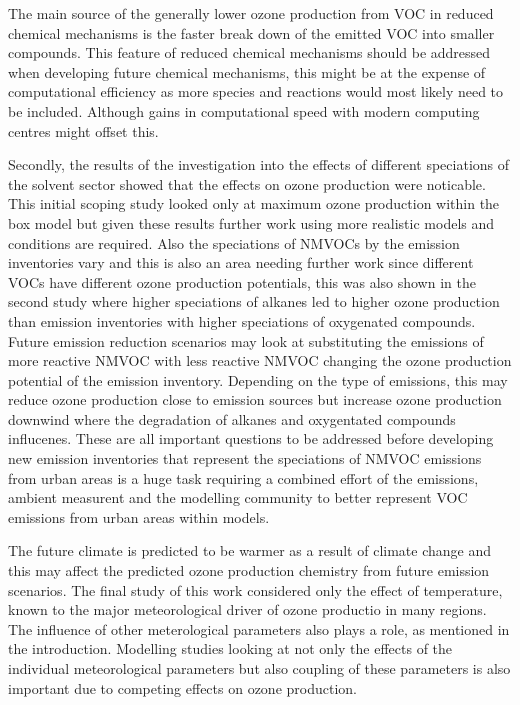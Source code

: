 The main source of the generally lower ozone production from VOC in reduced chemical mechanisms is the faster break down of the emitted VOC into smaller compounds.
This feature of reduced chemical mechanisms should be addressed when developing future chemical mechanisms, this might be at the expense of computational efficiency as more species and reactions would most likely need to be included.
Although gains in computational speed with modern computing centres might offset this.

Secondly, the results of the investigation into the effects of different speciations of the solvent sector showed that the effects on ozone production were noticable.
This initial scoping study looked only at maximum ozone production within the box model but given these results further work using more realistic models and conditions are required.
Also the speciations of NMVOCs by the emission inventories vary and this is also an area needing further work since different VOCs have different ozone production potentials, this was also shown in the second study where higher speciations of alkanes led to higher ozone production than emission inventories with higher speciations of oxygenated compounds.
Future emission reduction scenarios may look at substituting the emissions of more reactive NMVOC with less reactive NMVOC changing the ozone production potential of the emission inventory.
Depending on the type of emissions, this may reduce ozone production close to emission sources but increase ozone production downwind where the degradation of alkanes and oxygentated compounds influcenes.
These are all important questions to be addressed before developing new emission inventories that represent the speciations of NMVOC emissions from urban areas is a huge task requiring a combined effort of the emissions, ambient measurent and the modelling community to better represent VOC emissions from urban areas within models.

The future climate is predicted to be warmer as a result of climate change and this may affect the predicted ozone production chemistry from future emission scenarios.
The final study of this work considered only the effect of temperature, known to the major meteorological driver of ozone productio in many regions.
The influence of other meterological parameters also plays a role, as mentioned in the introduction.
Modelling studies looking at not only the effects of the individual meteorological parameters but also coupling of these parameters is also important due to competing effects on ozone production.

